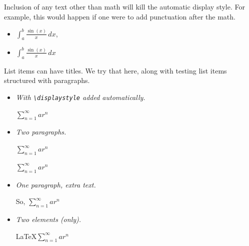 \documentclass{amsart}
\theoremstyle{plain}%
\theoremstyle{definition}%
\theoremstyle{remark}%
\newcommand{\mono}[1]{\texttt{#1}}
\newcommand{\lititle}[1]{{\slshape#1}}
\numberwithin{equation}{section}
\begin{document}
%
\par
Inclusion of any text other than math will kill the automatic display style. For example, this would happen if one were to add punctuation after the math.%
\par
%
\begin{itemize}[label=\textbullet]
\item{}\(\int_a^b \frac{\sin(x)}{x}\,dx\),%
\item{}\(\displaystyle \int_a^b \frac{\sin(x)}{x}\,dx\)%
\end{itemize}
%
\par
List items can have titles.  We try that here, along with testing list items structured with paragraphs.%
\begin{itemize}[label=\textbullet]
\item{}\lititle{With \mono{\textbackslash{}displaystyle} added automatically.}\par%
\(\displaystyle \sum_{n=1}^\infty ar^n\)%
\item{}\lititle{Two paragraphs.}\par%
\(\sum_{n=1}^\infty ar^n\)%
\par
\(\sum_{n=1}^\infty ar^n\)%
\item{}\lititle{One paragraph, extra text.}\par%
So, \(\sum_{n=1}^\infty ar^n\)%
\item{}\lititle{Two elements (only).}\par%
\LaTeX{}\(\sum_{n=1}^\infty ar^n\)%
\end{itemize}
%
%
%
\typeout{************************************************}
\typeout{************************************************}
%
\end{document}

